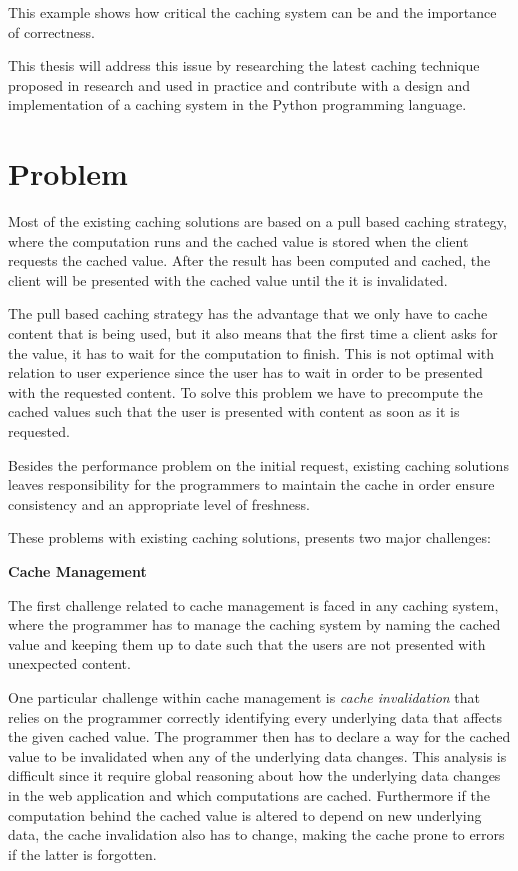 This example shows how critical the caching system can be and the importance of correctness.

This thesis will address this issue by researching the latest caching technique proposed in research and used in practice and contribute with a design and implementation of a caching system in the Python programming language.

\section{Problem}
\label{sec:problem}

Most of the existing caching solutions are based on a pull based caching strategy, where the computation runs and the cached value is stored when the client requests the cached value. After the result has been computed and cached, the client will be presented with the cached value until the it is invalidated.

The pull based caching strategy has the advantage that we only have to cache content that is being used, but it also means that the first time a client asks for the value, it has to wait for the computation to finish. This is not optimal with relation to user experience since the user has to wait in order to be presented with the requested content. To solve this problem we have to precompute the cached values such that the user is presented with content as soon as it is requested.

Besides the performance problem on the initial request, existing caching solutions leaves responsibility for the programmers to maintain the cache in order ensure consistency and an appropriate level of freshness.

These problems with existing caching solutions, presents two major challenges:

\textbf{Cache Management}

The first challenge related to cache management is faced in any caching system, where the programmer has to manage the caching system by naming the cached value and keeping them up to date such that the users are not presented with unexpected content.

One particular challenge within cache management is \emph{cache invalidation} that relies on the programmer correctly identifying every underlying data that affects the given cached value. The programmer then has to declare a way for the cached value to be invalidated when any of the underlying data changes. This analysis is difficult since it require global reasoning about how the underlying data changes in the web application and which computations are cached. Furthermore if the computation behind the cached value is altered to depend on new underlying data, the cache invalidation also has to change, making the cache prone to errors if the latter is forgotten.

